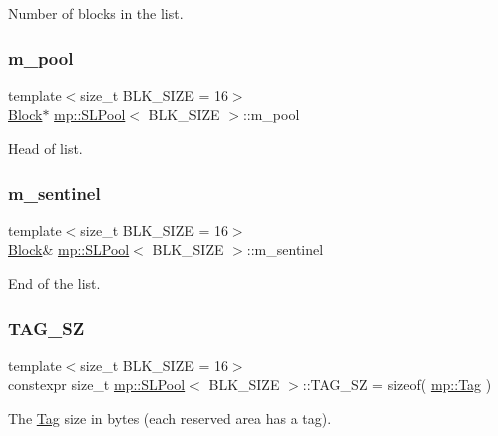 Number of blocks in the list. 

\mbox{\label{classmp_1_1_s_l_pool_a27f201ccadbf0bddca5ccc53473bde39}} 
\subsubsection{\texorpdfstring{m\+\_\+pool}{m\_pool}}
{\footnotesize\ttfamily template$<$size\+\_\+t B\+L\+K\+\_\+\+S\+I\+ZE = 16$>$ \\
\hyperlink{structmp_1_1_s_l_pool_1_1_block}{Block}$\ast$ \hyperlink{classmp_1_1_s_l_pool}{mp\+::\+S\+L\+Pool}$<$ B\+L\+K\+\_\+\+S\+I\+ZE $>$\+::m\+\_\+pool\hspace{0.3cm}{\ttfamily [private]}}



Head of list. 

\mbox{\label{classmp_1_1_s_l_pool_a3c3858050e1ca40c314ae8cfd3612d38}} 
\subsubsection{\texorpdfstring{m\+\_\+sentinel}{m\_sentinel}}
{\footnotesize\ttfamily template$<$size\+\_\+t B\+L\+K\+\_\+\+S\+I\+ZE = 16$>$ \\
\hyperlink{structmp_1_1_s_l_pool_1_1_block}{Block}\& \hyperlink{classmp_1_1_s_l_pool}{mp\+::\+S\+L\+Pool}$<$ B\+L\+K\+\_\+\+S\+I\+ZE $>$\+::m\+\_\+sentinel\hspace{0.3cm}{\ttfamily [private]}}



End of the list. 

\mbox{\label{classmp_1_1_s_l_pool_aa43372c95c4efa9d0609e6338d5ffacd}} 
\subsubsection{\texorpdfstring{T\+A\+G\+\_\+\+SZ}{TAG\_SZ}}
{\footnotesize\ttfamily template$<$size\+\_\+t B\+L\+K\+\_\+\+S\+I\+ZE = 16$>$ \\
constexpr size\+\_\+t \hyperlink{classmp_1_1_s_l_pool}{mp\+::\+S\+L\+Pool}$<$ B\+L\+K\+\_\+\+S\+I\+ZE $>$\+::T\+A\+G\+\_\+\+SZ = sizeof( \hyperlink{namespacemp_structmp_1_1_tag}{mp\+::\+Tag} )\hspace{0.3cm}{\ttfamily [static]}}



The \hyperlink{namespacemp_structmp_1_1_tag}{Tag} size in bytes (each reserved area has a tag). 

